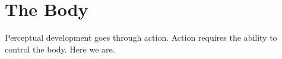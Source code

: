 \section{The Body}
Perceptual development goes through action. Action requires the ability to control the body. Here we are.
